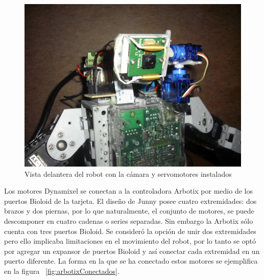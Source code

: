  
\begin{figure}[hbtp]
\centering
\includegraphics[scale=0.08]{imagenes/servosYcamara.JPG}
\caption{Vista delantera del robot con la cámara y servomotores instalados}
\label{fig:servosycam}
\end{figure}

Los motores Dynamixel se conectan a la controladora Arbotix por medio de los puertos Bioloid de la tarjeta. El diseño de Junny posee cuatro extremidades: dos brazos y dos piernas, por lo que naturalmente, el conjunto de motores, se puede descomponer en cuatro cadenas o series separadas. Sin embargo la Arbotix s\'olo cuenta con tres puertos Bioloid. Se consideró la opción de unir dos extremidades pero ello implicaba limitaciones en el movimiento del robot, por lo tanto se optó por agregar un expansor de puertos Bioloid y así conectar cada extremidad en un puerto diferente. La forma en la que se ha conectado estos motores se ejemplifica en la figura ~\ref{fig:arbotixConectados}. 

